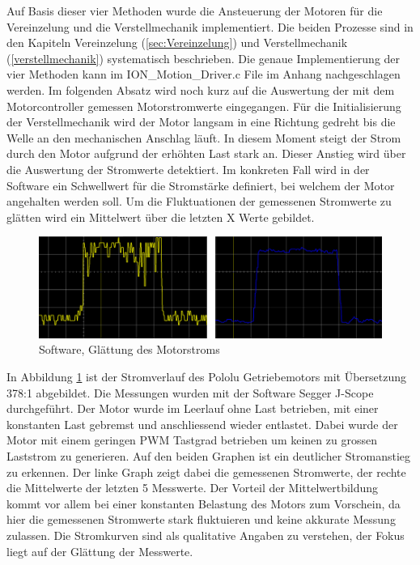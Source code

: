 Auf Basis dieser vier Methoden wurde die Ansteuerung der Motoren für die Vereinzelung und die Verstellmechanik implementiert. Die beiden Prozesse sind in den Kapiteln Vereinzelung (\ref{sec:Vereinzelung}) und Verstellmechanik (\ref{verstellmechanik}) systematisch beschrieben. Die genaue Implementierung der vier Methoden kann im ION\_Motion\_Driver.c File im Anhang nachgeschlagen werden. Im folgenden Absatz wird noch kurz auf die Auswertung der mit dem Motorcontroller gemessen Motorstromwerte eingegangen.\newline
Für die Initialisierung der Verstellmechanik wird der Motor langsam in eine Richtung gedreht bis die Welle an den mechanischen Anschlag läuft. In diesem Moment steigt der Strom durch den Motor aufgrund der erhöhten Last stark an. Dieser Anstieg wird über die Auswertung der Stromwerte detektiert. Im konkreten Fall wird in der Software ein Schwellwert für die Stromstärke definiert, bei welchem der Motor angehalten werden soll. Um die Fluktuationen der gemessenen Stromwerte zu glätten wird ein Mittelwert über die letzten X Werte gebildet.

\begin{figure}[H]
	\includegraphics[width=1\textwidth]{Illustrationen/6-Umsetzung/ION_Motion_Strommessung.png}
	\caption{Software, Glättung des Motorstroms}
	\label{fig:ION_Motion_Strommessung}
\end{figure}

In Abbildung \ref{fig:ION_Motion_Strommessung} ist der Stromverlauf des Pololu Getriebemotors mit Übersetzung 378:1 abgebildet. Die Messungen wurden mit der Software Segger J-Scope durchgeführt. Der Motor wurde im Leerlauf ohne Last betrieben, mit einer konstanten Last gebremst und anschliessend wieder entlastet. Dabei wurde der Motor mit einem geringen PWM Tastgrad betrieben um keinen zu grossen Laststrom zu generieren. Auf den beiden Graphen ist ein deutlicher Stromanstieg zu erkennen. Der linke Graph zeigt dabei die gemessenen Stromwerte, der rechte die Mittelwerte der letzten 5 Messwerte. Der Vorteil der Mittelwertbildung kommt vor allem bei einer konstanten Belastung des Motors zum Vorschein, da hier die gemessenen Stromwerte stark fluktuieren und keine akkurate Messung zulassen. Die Stromkurven sind als qualitative Angaben zu verstehen, der Fokus liegt auf der Glättung der Messwerte.


